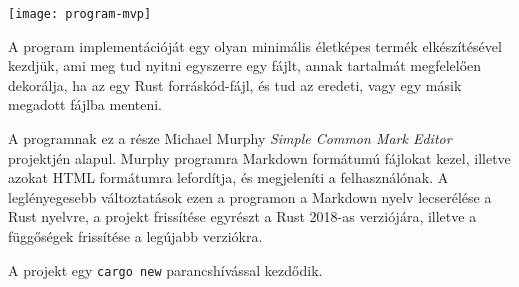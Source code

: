 
\graphicspath{{./kepek/}}


\texttt{[image: program-mvp]}

A program implementációját egy olyan minimális életképes termék elkészítésével kezdjük,
ami meg tud nyitni egyszerre egy fájlt, annak tartalmát megfelelően dekorálja,
ha az egy Rust forráskód-fájl, és tud az eredeti, vagy egy másik megadott fájlba menteni.

A programnak ez a része Michael Murphy \textit{Simple Common Mark Editor} projektjén alapul.\cite{gtk_tutorial}
Murphy programra Markdown formátumú fájlokat kezel, illetve azokat HTML formátumra lefordítja,
és megjeleníti a felhasználónak.
A leglényegesebb változtatások ezen a programon a Markdown nyelv lecserélése a Rust nyelvre,
a projekt frissítése egyrészt a Rust 2018-as verziójára, illetve a függőségek frissítése a legújabb verziókra.

A projekt egy \texttt{cargo new} parancshívással kezdődik.



